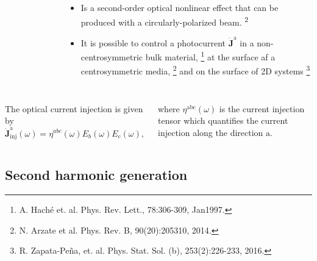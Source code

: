 \documentclass{beamer}
\begin{document}
\begin{frame}
{\begin{columns}
\begin{figure}[h!]
\begin{tikzpicture}
\end{tikzpicture}
\end{figure}



\begin{itemize}

\item 
Is a second-order optical nonlinear effect that can be produced with a
circularly-polarized beam.\textsuperscript{ 2}

\item 
It is possible to control a photocurrent $\mathbf{\dot{J}^{\mathrm{a}}}$ in a 
non-centrosymmetric bulk material,%
\footnote[frame]{\tiny A. Hach\'e et. al. Phys. Rev. Lett., 78:306-309, 
Jan1997.}
at the surface af a centrosymmetric media,%
\footnote[frame]{\tiny N. Arzate et al. Phys. Rev. B, 90(20):205310, 2014.}
and on the surface of 2D systems%
\footnote[frame]{\tiny R. Zapata-Pe\~na, et. al. Phys. Stat. Sol. (b), 
253(2):226-233, 2016.}

\end{itemize}

\end{columns}

\begin{columns}


The optical current injection is given by
\vspace{-1mm}
\begin{equation}\label{eq:oci}
\mathbf{\dot{J}}^{\mathrm{a}}_{\text{inj}}(\omega) =
\eta^{abc}(\omega)E_{b}(\omega)E_{c}(\omega),
\end{equation}

\vspace{-2mm}
where $\eta^{\mathrm{abc}}(\omega)$ is the current injection tensor which 
quantifies the current injection along the direction $\mathrm{a}$.

\vspace{1mm}
\end{columns}

}

\end{frame}





\subsection{Second harmonic generation}
\end{document}
